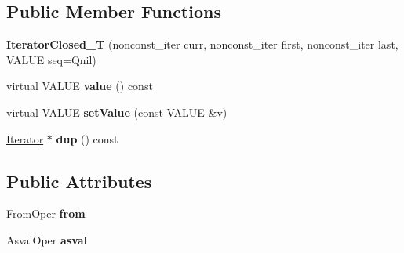 \subsection*{Public Member Functions}
\begin{DoxyCompactItemize}
\item 
{\bfseries Iterator\+Closed\+\_\+T} (nonconst\+\_\+iter curr, nonconst\+\_\+iter first, nonconst\+\_\+iter last, V\+A\+L\+UE seq=Qnil)\hypertarget{classswig_1_1IteratorClosed__T_3_01InOutIterator_00_01bool_00_01FromOper_00_01AsvalOper_01_4_a7a2eb97d646e3031c4cc1fb2b9dbc124}{}\label{classswig_1_1IteratorClosed__T_3_01InOutIterator_00_01bool_00_01FromOper_00_01AsvalOper_01_4_a7a2eb97d646e3031c4cc1fb2b9dbc124}

\item 
virtual V\+A\+L\+UE {\bfseries value} () const \hypertarget{classswig_1_1IteratorClosed__T_3_01InOutIterator_00_01bool_00_01FromOper_00_01AsvalOper_01_4_a8a6259b39b4cecc92abaac785aea7114}{}\label{classswig_1_1IteratorClosed__T_3_01InOutIterator_00_01bool_00_01FromOper_00_01AsvalOper_01_4_a8a6259b39b4cecc92abaac785aea7114}

\item 
virtual V\+A\+L\+UE {\bfseries set\+Value} (const V\+A\+L\+UE \&v)\hypertarget{classswig_1_1IteratorClosed__T_3_01InOutIterator_00_01bool_00_01FromOper_00_01AsvalOper_01_4_acf37730ff7dc936c89e791e70603cd93}{}\label{classswig_1_1IteratorClosed__T_3_01InOutIterator_00_01bool_00_01FromOper_00_01AsvalOper_01_4_acf37730ff7dc936c89e791e70603cd93}

\item 
\hyperlink{structswig_1_1Iterator}{Iterator} $\ast$ {\bfseries dup} () const \hypertarget{classswig_1_1IteratorClosed__T_3_01InOutIterator_00_01bool_00_01FromOper_00_01AsvalOper_01_4_a8f608b2eca2fa67b1ebcb4a2c70d06f6}{}\label{classswig_1_1IteratorClosed__T_3_01InOutIterator_00_01bool_00_01FromOper_00_01AsvalOper_01_4_a8f608b2eca2fa67b1ebcb4a2c70d06f6}

\end{DoxyCompactItemize}
\subsection*{Public Attributes}
\begin{DoxyCompactItemize}
\item 
From\+Oper {\bfseries from}\hypertarget{classswig_1_1IteratorClosed__T_3_01InOutIterator_00_01bool_00_01FromOper_00_01AsvalOper_01_4_ae629e6d64e763bce69e9f2523ad7f016}{}\label{classswig_1_1IteratorClosed__T_3_01InOutIterator_00_01bool_00_01FromOper_00_01AsvalOper_01_4_ae629e6d64e763bce69e9f2523ad7f016}

\item 
Asval\+Oper {\bfseries asval}\hypertarget{classswig_1_1IteratorClosed__T_3_01InOutIterator_00_01bool_00_01FromOper_00_01AsvalOper_01_4_a2a55afc41799fd8ed72b9f0f13104665}{}\label{classswig_1_1IteratorClosed__T_3_01InOutIterator_00_01bool_00_01FromOper_00_01AsvalOper_01_4_a2a55afc41799fd8ed72b9f0f13104665}

\end{DoxyCompactItemize}
